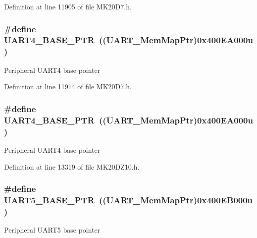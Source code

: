 Definition at line 11905 of file M\+K20\+D7.\+h.

\subsubsection[{\texorpdfstring{U\+A\+R\+T4\+\_\+\+B\+A\+S\+E\+\_\+\+P\+TR}{UART4_BASE_PTR}}]{\setlength{\rightskip}{0pt plus 5cm}\#define U\+A\+R\+T4\+\_\+\+B\+A\+S\+E\+\_\+\+P\+TR~(({\bf U\+A\+R\+T\+\_\+\+Mem\+Map\+Ptr})0x400\+E\+A000u)}\hypertarget{group___u_a_r_t___peripheral_ga680f97e081544c697ee071702b2de587}{}\label{group___u_a_r_t___peripheral_ga680f97e081544c697ee071702b2de587}
Peripheral U\+A\+R\+T4 base pointer 

Definition at line 11914 of file M\+K20\+D7.\+h.

\subsubsection[{\texorpdfstring{U\+A\+R\+T4\+\_\+\+B\+A\+S\+E\+\_\+\+P\+TR}{UART4_BASE_PTR}}]{\setlength{\rightskip}{0pt plus 5cm}\#define U\+A\+R\+T4\+\_\+\+B\+A\+S\+E\+\_\+\+P\+TR~(({\bf U\+A\+R\+T\+\_\+\+Mem\+Map\+Ptr})0x400\+E\+A000u)}\hypertarget{group___u_a_r_t___peripheral_ga680f97e081544c697ee071702b2de587}{}\label{group___u_a_r_t___peripheral_ga680f97e081544c697ee071702b2de587}
Peripheral U\+A\+R\+T4 base pointer 

Definition at line 13319 of file M\+K20\+D\+Z10.\+h.

\subsubsection[{\texorpdfstring{U\+A\+R\+T5\+\_\+\+B\+A\+S\+E\+\_\+\+P\+TR}{UART5_BASE_PTR}}]{\setlength{\rightskip}{0pt plus 5cm}\#define U\+A\+R\+T5\+\_\+\+B\+A\+S\+E\+\_\+\+P\+TR~(({\bf U\+A\+R\+T\+\_\+\+Mem\+Map\+Ptr})0x400\+E\+B000u)}\hypertarget{group___u_a_r_t___peripheral_gace0110558cde93abab79b033e3caf755}{}\label{group___u_a_r_t___peripheral_gace0110558cde93abab79b033e3caf755}
Peripheral U\+A\+R\+T5 base pointer 

